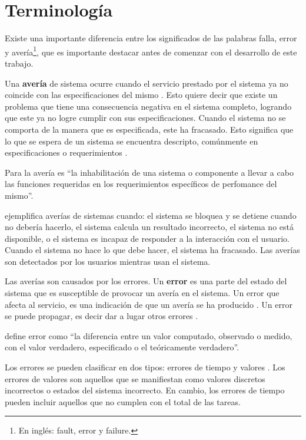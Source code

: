 \section{Terminología}\label{sec:terminologia}
Existe una importante diferencia entre los significados de las palabras falla, error y
avería\footnote{En inglés: fault, error y failure.}, que es importante destacar antes de comenzar
con el desarrollo de este trabajo.

Una \textbf{avería} de sistema ocurre cuando el servicio prestado por el sistema ya no coincide con
las especificaciones del mismo \citep{Hanmer07}. Esto quiere decir que existe un problema que tiene
una consecuencia negativa en el sistema completo, logrando que este ya no logre cumplir con sus
especificaciones. Cuando el sistema no se comporta de la manera que es especificada, este ha
fracasado. Esto significa que lo que se espera de un sistema se encuentra descripto, comúnmente en
especificaciones o requerimientos \citep{Pullum01}.

Para la \cite{IEEE610.12} avería es ``la inhabilitación de una sistema o componente a llevar a
cabo las funciones requeridas en los requerimientos específicos de perfomance del mismo''.

\cite{Hanmer07} ejemplifica averías de sistemas cuando: el sistema se bloquea y se detiene cuando no
debería hacerlo, el sistema calcula un resultado incorrecto, el sistema no está disponible, o el
sistema es incapaz de responder a la interacción con el usuario. Cuando el sistema no hace lo que
debe hacer, el sistema ha fracasado. Las averías son detectados por los usuarios mientras usan el
sistema.

Las averías son causados por los errores. Un \textbf{error} es una parte del estado del sistema
que es susceptible de provocar un avería en el sistema. Un error que afecta al servicio, es una
indicación de que un avería se ha producido \citep{Hanmer07}. Un error se puede propagar, es decir
dar a lugar otros errores \citep{Pullum01}.

\cite{IEEE610.12} define error como ``la diferencia entre un valor computado, observado o medido,
con el valor verdadero, especificado o el teóricamente verdadero''.

Los errores se pueden clasificar en dos tipos: errores de tiempo y valores \citep{Hanmer07}. Los
errores de valores son aquellos que se manifiestan como valores discretos incorrectos o estados del
sistema incorrecto. En cambio, los errores de tiempo pueden incluir aquellos que no cumplen con el total de las tareas.

